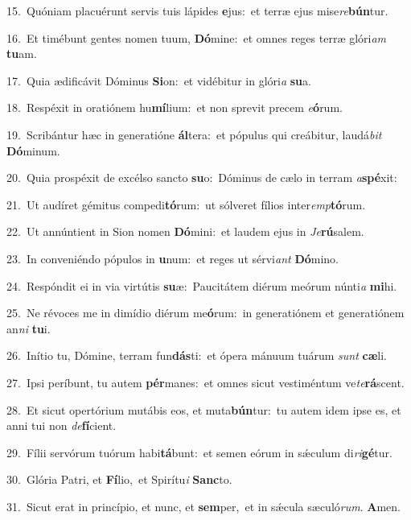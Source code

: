 {\numbfont\textcolor{\numbcolor}{15.}}~Quóniam placuérunt servis tuis lápides \textbf{e}\-jus:~\star et terræ ejus mise\-\textit{re}\-\textbf{bún}tur.\par
{\numbfont\textcolor{\numbcolor}{16.}}~Et timébunt gentes nomen tuum, \textbf{Dó}\-mine:~\star et omnes reges terræ glóri\textit{am} \textbf{tu}\-am.\par
{\numbfont\textcolor{\numbcolor}{17.}}~Quia ædificávit Dóminus \textbf{Si}\-on:~\star et vidébitur in glóri\textit{a} \textbf{su}\-a.\par
{\numbfont\textcolor{\numbcolor}{18.}}~Respéxit in oratiónem hu\-\textbf{mí}\-lium:~\star et non sprevit precem \textit{e}\-\textbf{ó}rum.\par
{\numbfont\textcolor{\numbcolor}{19.}}~Scribántur hæc in generatióne \textbf{ál}\-tera:~\star et pópulus qui creábitur, laudá\textit{bit} \textbf{Dó}\-minum.\par
{\numbfont\textcolor{\numbcolor}{20.}}~Quia prospéxit de excélso sancto \textbf{su}\-o:~\star Dóminus de cælo in terram \textit{a}\-\textbf{spé}xit:\par
{\numbfont\textcolor{\numbcolor}{21.}}~Ut audíret gémitus compedi\-\textbf{tó}\-rum:~\star ut sólveret fílios inter\-\textit{emp}\-\textbf{tó}rum.\par
{\numbfont\textcolor{\numbcolor}{22.}}~Ut annúntient in Sion nomen \textbf{Dó}\-mini:~\star et laudem ejus in \textit{Je}\-\textbf{rú}salem.\par
{\numbfont\textcolor{\numbcolor}{23.}}~In conveniéndo pópulos in \textbf{u}\-num:~\star et reges ut sérvi\textit{ant} \textbf{Dó}\-mino.\par
{\numbfont\textcolor{\numbcolor}{24.}}~Respóndit ei in via virtútis \textbf{su}\-æ:~\star Paucitátem diérum meórum núnti\textit{a} \textbf{mi}\-hi.\par
{\numbfont\textcolor{\numbcolor}{25.}}~Ne révoces me in dimídio diérum me\-\textbf{ó}\-rum:~\star in generatiónem et generatiónem an\textit{ni} \textbf{tu}\-i.\par
{\numbfont\textcolor{\numbcolor}{26.}}~Inítio tu, Dómine, terram fun\-\textbf{dás}\-ti:~\star et ópera mánuum tuárum \textit{sunt} \textbf{cæ}\-li.\par
{\numbfont\textcolor{\numbcolor}{27.}}~Ipsi períbunt, tu autem \textbf{pér}\-manes:~\star et omnes sicut vestiméntum ve\-\textit{te}\-\textbf{rá}scent.\par
{\numbfont\textcolor{\numbcolor}{28.}}~Et sicut opertórium mutábis eos, et muta\-\textbf{bún}\-tur:~\star tu autem idem ipse es, et anni tui non \textit{de}\-\textbf{fí}cient.\par
{\numbfont\textcolor{\numbcolor}{29.}}~Fílii servórum tuórum habi\-\textbf{tá}\-bunt:~\star et semen eórum in sǽculum di\-\textit{ri}\-\textbf{gé}tur.\par
{\numbfont\textcolor{\numbcolor}{30.}}~Glória Patri, et \textbf{Fí}\-lio,~\star et Spirítu\textit{i} \textbf{Sanc}\-to.\par
{\numbfont\textcolor{\numbcolor}{31.}}~Sicut erat in princípio, et nunc, et \textbf{sem}\-per,~\star et in sǽcula sæculó\-\textit{rum}\-. \textbf{A}\-men.\par
